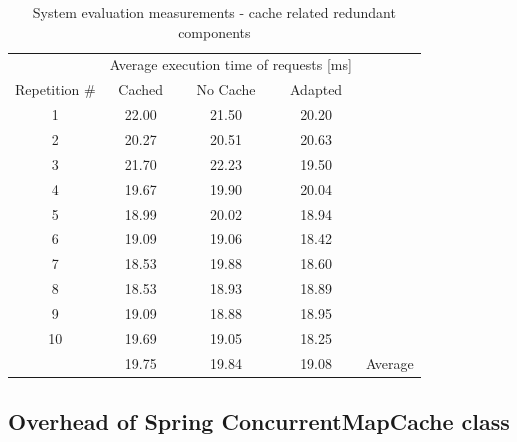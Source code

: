 \documentclass[12pt,a4paper]{article}
\begin{document}
\begin{table}[ht]
\begin{center}
\begin{tabular}{c| ccc |c}
    & \multicolumn{3}{C{5cm}|}{Average execution time of requests [ms]} & \\ 
    Repetition \# & Cached & No Cache & Adapted &\\ \cline{1-4}
    1		  &22.00 & 21.50  & 20.20 &\\ 
    2		  &20.27 & 20.51  &	20.63 &\\ 
    3		  &21.70 & 22.23  &	19.50 &\\ 
    4		  &19.67 & 19.90  & 20.04 &\\ 
    5		  &18.99 & 20.02  &	18.94 &\\
    6		  &19.09 & 19.06  &	18.42 &\\ 
    7		  &18.53 & 19.88  & 18.60 &\\
    8		  &18.53 & 18.93  &	18.89 &\\
    9		  &19.09 & 18.88  &	18.95 &\\ 
    10		  &19.69 & 19.05  &	18.25 &\\ \cline{1-5}
        	  &19.75 & 19.84  & 19.08 & \multicolumn{1}{c}{Average} \\ 
\end{tabular}
\end{center}
\caption{System evaluation measurements - cache related redundant components}
\label{appendixmeasurementscache}
\end{table}


\pagebreak
\subsection{Overhead of Spring ConcurrentMapCache class} \label{appendixspringconcurentmap}
\end{document}
